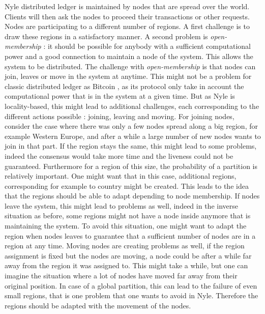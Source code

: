 \documentclass[a4paper,11pt,oneside]{report}
\begin{document}
Nyle distributed ledger is maintained by nodes that are spread over the world.
Clients will then ask the nodes to proceed their transactions or other
requests. Nodes are participating to a different number of regions. A first
challenge is to draw these regions in a satisfactory manner. A second problem
is \textit{open-membership} : it should be possible for anybody with a
sufficient computational power and a good connection to maintain a node of the
system. This allows the system to be distributed. The challenge with
\textit{open-membership} is that nodes can join, leaves or move in the system
at anytime. This might not be a problem for classic distributed ledger as
Bitcoin \cite{Nakamoto2009}, as its protocol only take in account the computational
power that is in the system at a given time. But as Nyle is locality-based,
this might lead to additional challenges, each corresponding to the different
actions possible : joining, leaving and moving. For joining nodes, consider the
case where there was only a few nodes spread along a big region, for example
Western Europe, and after a while a large number of new nodes wants to join in
that part. If the region stays the same, this might lead to some problems,
indeed the consensus would take more time and the liveness could not be
guaranteed. Furthermore for a region of this size, the probability of a
partition is relatively important. One might want that in this case, additional
regions, corresponding for example to country might be created. This leads to
the idea that the regions should be able to adapt depending to node membership.
If nodes leave the system, this might lead to problems as well, indeed in the
inverse situation as before, some regions might not have a node inside anymore
that is maintaining the system. To avoid this situation, one might want to
adapt the region when nodes leaves to guarantee that a sufficient number of
nodes are in a region at any time. Moving nodes are creating problems as well,
if the region assignment is fixed but the nodes are moving, a node could be
after a while far away from the region it was assigned to. This might take a
while, but one can imagine the situation where a lot of nodes have moved far
away from their original position. In case of a global partition, this can lead
to the failure of even small regions, that is one problem that one wants to
avoid in Nyle. Therefore the regions should be adapted with the movement of the
nodes. 
\end{document}
